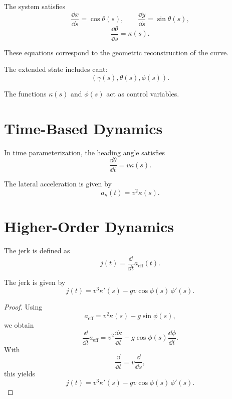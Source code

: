 \begin{proposition}
The system satisfies
\[
\frac{\dd x}{\dd s} = \cos\theta(s),
\qquad
\frac{\dd y}{\dd s} = \sin\theta(s),
\]
\[
\frac{\dd \theta}{\dd s} = \kappa(s).
\]
\end{proposition}

\begin{remark}
These equations correspond to the geometric reconstruction of the curve.
\end{remark}

\begin{definition}
The extended state includes cant:
\[
(\gamma(s), \theta(s), \phi(s)).
\]
\end{definition}

\begin{remark}
The functions \(\kappa(s)\) and \(\phi(s)\) act as control variables.
\end{remark}

\section{Time-Based Dynamics}

\begin{proposition}
In time parameterization, the heading angle satisfies
\[
\frac{\dd \theta}{\dd t} = v \kappa(s).
\]
\end{proposition}

\begin{proposition}
The lateral acceleration is given by
\[
a_\kappa(t) = v^2 \kappa(s).
\]
\end{proposition}

\section{Higher-Order Dynamics}

\begin{definition}[Jerk]
The jerk is defined as
\[
j(t) = \frac{\dd}{\dd t} a_{\mathrm{eff}}(t).
\]
\end{definition}

\begin{proposition}
The jerk is given by
\[
j(t)
=
v^3 \kappa'(s)
-
g v \cos\phi(s)\,\phi'(s).
\]
\end{proposition}

\begin{proof}
Using
\[
a_{\mathrm{eff}} = v^2 \kappa(s) - g \sin\phi(s),
\]
we obtain
\[
\frac{\dd}{\dd t} a_{\mathrm{eff}}
=
v^2 \frac{\dd \kappa}{\dd t}
-
g \cos\phi(s) \frac{\dd \phi}{\dd t}.
\]
With
\[
\frac{\dd}{\dd t} = v \frac{\dd}{\dd s},
\]
this yields
\[
j(t)
=
v^3 \kappa'(s)
-
g v \cos\phi(s)\,\phi'(s).
\]
\end{proof}

